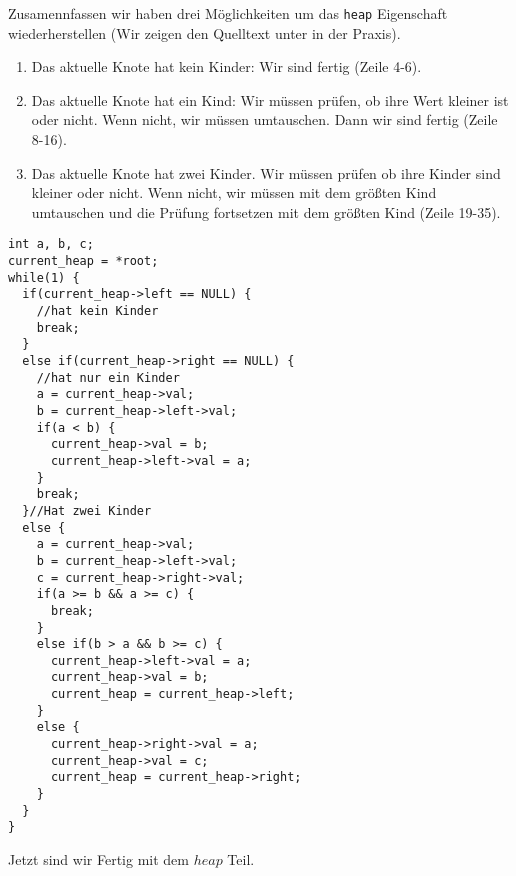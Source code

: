 Zusamennfassen wir haben drei Möglichkeiten um das \texttt{heap} Eigenschaft wiederherstellen
(Wir zeigen den Quelltext unter in der Praxis).
\begin{enumerate}
\item Das aktuelle Knote hat kein Kinder: Wir sind fertig (Zeile 4-6).
\item Das aktuelle Knote hat ein Kind: Wir müssen prüfen, ob ihre Wert kleiner ist oder nicht.
Wenn nicht, wir müssen umtauschen. Dann wir sind fertig (Zeile 8-16).
\item Das aktuelle Knote hat zwei Kinder. Wir müssen prüfen ob ihre Kinder sind kleiner oder nicht.
Wenn nicht, wir müssen mit dem größten Kind umtauschen und die Prüfung fortsetzen mit dem größten Kind (Zeile 19-35).
\end{enumerate}
\begin{lstlisting}
int a, b, c;
current_heap = *root;
while(1) {
  if(current_heap->left == NULL) {
    //hat kein Kinder
    break;
  }
  else if(current_heap->right == NULL) {
    //hat nur ein Kinder
    a = current_heap->val;
    b = current_heap->left->val;
    if(a < b) {
      current_heap->val = b;
      current_heap->left->val = a;
    }
    break;
  }//Hat zwei Kinder
  else {
    a = current_heap->val;
    b = current_heap->left->val;
    c = current_heap->right->val;
    if(a >= b && a >= c) {
      break;
    }
    else if(b > a && b >= c) {
      current_heap->left->val = a;
      current_heap->val = b;
      current_heap = current_heap->left;
    }
    else {
      current_heap->right->val = a;
      current_heap->val = c;
      current_heap = current_heap->right;
    }
  }
}
\end{lstlisting}
Jetzt sind wir Fertig mit dem $heap$ Teil.

